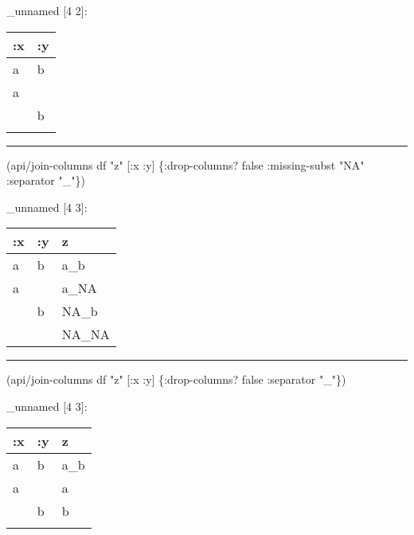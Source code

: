 \documentclass[]{article}
\newenvironment{Shaded}{\begin{snugshade}}{\end{snugshade}}
\newcommand{\StringTok}[1]{\textcolor[rgb]{0.31,0.60,0.02}{#1}}
\newcommand{\VariableTok}[1]{\textcolor[rgb]{0.00,0.00,0.00}{#1}}
\newcommand{\AttributeTok}[1]{\textcolor[rgb]{0.77,0.63,0.00}{#1}}
\newcommand{\NormalTok}[1]{#1}
\begin{document}
\_unnamed {[}4 2{]}:

\begin{longtable}[]{@{}ll@{}}
\toprule
:x & :y\tabularnewline
\midrule
\endhead
a & b\tabularnewline
a &\tabularnewline
& b\tabularnewline
&\tabularnewline
\bottomrule
\end{longtable}

\begin{center}\rule{0.5\linewidth}{0.5pt}\end{center}

\begin{Shaded}
\begin{Highlighting}[]
\NormalTok{(api/join-columns df }\StringTok{"z"}\NormalTok{ [}\AttributeTok{:x} \AttributeTok{:y}\NormalTok{] \{}\AttributeTok{:drop-columns}\NormalTok{? }\VariableTok{false}
                                  \AttributeTok{:missing-subst} \StringTok{"NA"}
                                  \AttributeTok{:separator} \StringTok{"_"}\NormalTok{\})}
\end{Highlighting}
\end{Shaded}

\_unnamed {[}4 3{]}:

\begin{longtable}[]{@{}lll@{}}
\toprule
:x & :y & z\tabularnewline
\midrule
\endhead
a & b & a\_b\tabularnewline
a & & a\_NA\tabularnewline
& b & NA\_b\tabularnewline
& & NA\_NA\tabularnewline
\bottomrule
\end{longtable}

\begin{center}\rule{0.5\linewidth}{0.5pt}\end{center}

\begin{Shaded}
\begin{Highlighting}[]
\NormalTok{(api/join-columns df }\StringTok{"z"}\NormalTok{ [}\AttributeTok{:x} \AttributeTok{:y}\NormalTok{] \{}\AttributeTok{:drop-columns}\NormalTok{? }\VariableTok{false}
                                  \AttributeTok{:separator} \StringTok{"_"}\NormalTok{\})}
\end{Highlighting}
\end{Shaded}

\_unnamed {[}4 3{]}:

\begin{longtable}[]{@{}lll@{}}
\toprule
:x & :y & z\tabularnewline
\midrule
\endhead
a & b & a\_b\tabularnewline
a & & a\tabularnewline
& b & b\tabularnewline
& &\tabularnewline
\bottomrule
\end{longtable}
\end{document}
